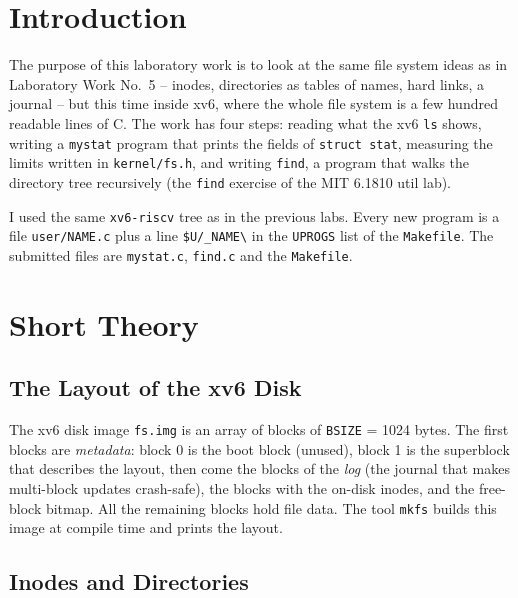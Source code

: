 \documentclass[12pt,a4paper]{article}
\begin{document}
\setcounter{page}{2}
\tableofcontents
\newpage

\section*{Introduction}

The purpose of this laboratory work is to look at the same file system ideas as in Laboratory Work No.~5 -- inodes, directories as tables of names, hard links, a journal -- but this time inside xv6, where the whole file system is a few hundred readable lines of C. The work has four steps: reading what the xv6 \texttt{ls} shows, writing a \texttt{mystat} program that prints the fields of \texttt{struct stat}, measuring the limits written in \texttt{kernel/fs.h}, and writing \texttt{find}, a program that walks the directory tree recursively (the \texttt{find} exercise of the MIT 6.1810 util lab).

I used the same \texttt{xv6-riscv} tree as in the previous labs. Every new program is a file \texttt{user/NAME.c} plus a line \texttt{\$U/\_NAME\textbackslash} in the \texttt{UPROGS} list of the \texttt{Makefile}. The submitted files are \texttt{mystat.c}, \texttt{find.c} and the \texttt{Makefile}.

\newpage
\section{Short Theory}

\subsection{The Layout of the xv6 Disk}

The xv6 disk image \texttt{fs.img} is an array of blocks of \texttt{BSIZE} = 1024 bytes. The first blocks are \textit{metadata}: block 0 is the boot block (unused), block 1 is the superblock that describes the layout, then come the blocks of the \textit{log} (the journal that makes multi-block updates crash-safe), the blocks with the on-disk inodes, and the free-block bitmap. All the remaining blocks hold file data. The tool \texttt{mkfs} builds this image at compile time and prints the layout.

\subsection{Inodes and Directories}
\end{document}
